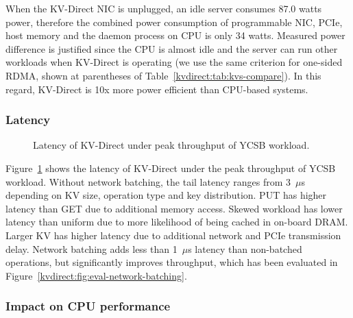 When the KV-Direct NIC is unplugged, an idle server consumes 87.0 watts power, therefore the combined power consumption of programmable NIC, PCIe, host memory and the daemon process on CPU is only 34 watts.
Measured power difference is justified since the CPU is almost idle and the server can run other workloads when KV-Direct is operating (we use the same criterion for one-sided RDMA, shown at parentheses of Table~\ref{kvdirect:tab:kvs-compare}).
In this regard, KV-Direct is 10x more power efficient than CPU-based systems.

\subsubsection{Latency}
\begin{figure}[t]
\centering
{}
\caption{Latency of KV-Direct under peak throughput of YCSB workload.}
\label{kvdirect:fig:ycsb-lat}

\end{figure}

Figure~\ref{kvdirect:fig:ycsb-lat} shows the latency of KV-Direct under the peak throughput of YCSB workload.
Without network batching, the tail latency ranges from 3~$\mu$s depending on KV size, operation type and key distribution.
PUT has higher latency than GET due to additional memory access.
Skewed workload has lower latency than uniform due to more likelihood of being cached in on-board DRAM.
Larger KV has higher latency due to additional network and PCIe transmission delay.
Network batching adds less than 1~$\mu$s latency than non-batched operations, but significantly improves throughput, which has been evaluated in Figure~\ref{kvdirect:fig:eval-network-batching}.

\subsubsection{Impact on CPU performance}

